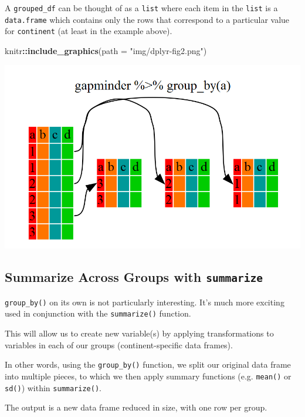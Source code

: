 \documentclass[]{book}
\newenvironment{Shaded}{\begin{snugshade}}{\end{snugshade}}
\newcommand{\KeywordTok}[1]{\textcolor[rgb]{0.13,0.29,0.53}{\textbf{#1}}}
\newcommand{\DataTypeTok}[1]{\textcolor[rgb]{0.13,0.29,0.53}{#1}}
\newcommand{\StringTok}[1]{\textcolor[rgb]{0.31,0.60,0.02}{#1}}
\newcommand{\OperatorTok}[1]{\textcolor[rgb]{0.81,0.36,0.00}{\textbf{#1}}}
\newcommand{\NormalTok}[1]{#1}
\begin{document}
A \texttt{grouped\_df} can be thought of as a \texttt{list} where each
item in the \texttt{list} is a \texttt{data.frame} which contains only
the rows that correspond to a particular value for \texttt{continent}
(at least in the example above).

\begin{Shaded}
\begin{Highlighting}[]
\NormalTok{knitr}\OperatorTok{::}\KeywordTok{include_graphics}\NormalTok{(}\DataTypeTok{path =} \StringTok{"img/dplyr-fig2.png"}\NormalTok{)}
\end{Highlighting}
\end{Shaded}

\begin{center}\includegraphics[width=0.7\linewidth]{img/dplyr-fig2} \end{center}

\subsection{\texorpdfstring{Summarize Across Groups with
\texttt{summarize}}{Summarize Across Groups with summarize}}\label{summarize-across-groups-with-summarize}

\texttt{group\_by()} on its own is not particularly interesting. It's
much more exciting used in conjunction with the \texttt{summarize()}
function.

This will allow us to create new variable(s) by applying transformations
to variables in each of our groups (continent-specific data frames).

In other words, using the \texttt{group\_by()} function, we split our
original data frame into multiple pieces, to which we then apply summary
functions (e.g. \texttt{mean()} or \texttt{sd()}) within
\texttt{summarize()}.

The output is a new data frame reduced in size, with one row per group.

\begin{Shaded}
\end{Shaded}
\end{document}
